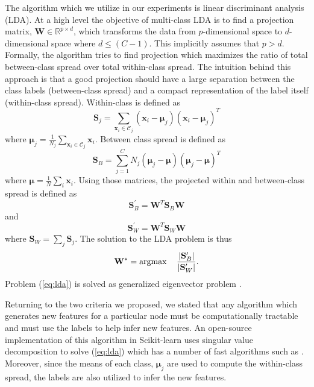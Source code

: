 \documentclass[../thesis.tex]{subfiles}
\begin{document}
The algorithm which we utilize in our experiments is linear discriminant analysis (LDA). At a high level the objective of multi-class LDA is to find a projection matrix, $\mathbf{W} \in \mathbb{R}^{p \times d}$, which transforms the data from $p$-dimensional space to $d$-dimensional space where $d \leq (C-1)$. This implicitly assumes that $p > d$. Formally, the algorithm tries to find projection which maximizes the ratio of total between-class spread over total within-class spread. The intuition behind this approach is that a good projection should have a large separation between the class labels (between-class spread) and a compact representation of the label itself (within-class spread). Within-class is defined as
\begin{equation}
    \mathbf{S}_j = \sum_{\mathbf{x}_i \in \mathcal{C}_j} (\mathbf{x}_i - \boldsymbol{\mu}_j)(\mathbf{x}_i - \boldsymbol{\mu}_j)^T
\end{equation}
where $\boldsymbol{\mu}_j = \frac{1}{N_j} \sum_{\mathbf{x}_i \in \mathcal{C}_j} \mathbf{x}_i$. Between class spread is defined as
\begin{equation}
    \mathbf{S}_B = \sum_{j=1}^C N_j (\boldsymbol{\mu}_j - \boldsymbol{\mu})(\boldsymbol{\mu}_j - \boldsymbol{\mu})^T
\end{equation}
where $\boldsymbol{\mu} = \frac{1}{N} \sum_i \mathbf{x}_i$. Using those matrices, the projected within and between-class spread is defined as
\begin{equation}
    \mathbf{S}_B^\prime = \mathbf{W}^T \mathbf{S}_B \mathbf{W}
\end{equation}
and
\begin{equation}
    \mathbf{S}_W^\prime = \mathbf{W}^T \mathbf{S}_W \mathbf{W}
\end{equation}
where $\mathbf{S}_W = \sum_j \mathbf{S}_j.$ The solution to the LDA problem is thus
\begin{equation}
    \label{eq:lda}
    \mathbf{W}^* = \operatorname*{argmax} \quad \frac{\left| \mathbf{S}_B^\prime \right|}{\left| \mathbf{S}_W^\prime \right|}.
\end{equation}
Problem (\ref{eq:lda}) is solved as generalized eigenvector problem \cite{mika1999fisher}.

Returning to the two criteria we proposed, we stated that any algorithm which generates new features for a particular node must be computationally tractable and must use the labels to help infer new features. An open-source implementation of this algorithm in Scikit-learn uses singular value decomposition to solve (\ref{eq:lda}) which has a number of fast algorithms such as \cite{halko2011finding}. Moreover, since the means of each class, $\boldsymbol{\mu}_j$ are used to compute the within-class spread, the labels are also utilized to infer the new features.
\end{document}
